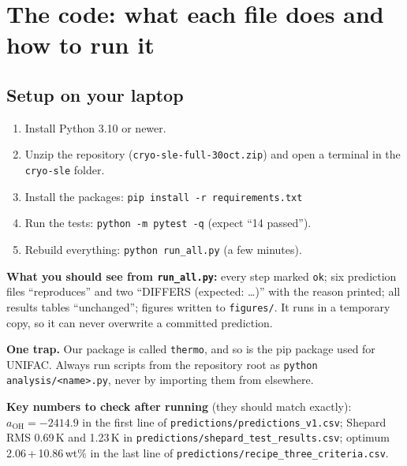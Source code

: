 \documentclass[11pt,a4paper]{article}
\newcommand{\aoh}{a_{\mathrm{OH}}}
\newcommand{\file}[1]{\texttt{\small #1}}
\begin{document}
\section{The code: what each file does and how to run it}

\subsection{Setup on your laptop}
\begin{enumerate}
\item Install Python 3.10 or newer.
\item Unzip the repository (\file{cryo-sle-full-30oct.zip}) and open a terminal in the \file{cryo-sle} folder.
\item Install the packages: \file{pip install -r requirements.txt}
\item Run the tests: \file{python -m pytest -q} (expect ``14 passed'').
\item Rebuild everything: \file{python run\_all.py} (a few minutes).
\end{enumerate}
\textbf{What you should see from \file{run\_all.py}:} every step marked \texttt{ok}; six prediction files ``reproduces''
and two ``DIFFERS (expected: \ldots)'' with the reason printed; all results tables ``unchanged''; figures written to
\file{figures/}. It runs in a temporary copy, so it can never overwrite a committed prediction.

\textbf{One trap.} Our package is called \file{thermo}, and so is the pip package used for UNIFAC. Always run scripts
from the repository root as \file{python analysis/<name>.py}, never by importing them from elsewhere.

\textbf{Key numbers to check after running} (they should match exactly): $\aoh=-2414.9$ in the first line of
\file{predictions/predictions\_v1.csv}; Shepard RMS 0.69\,K and 1.23\,K in \file{predictions/shepard\_test\_results.csv};
optimum 2.06\,+\,10.86\,wt\% in the last line of \file{predictions/recipe\_three\_criteria.csv}.
\end{document}
